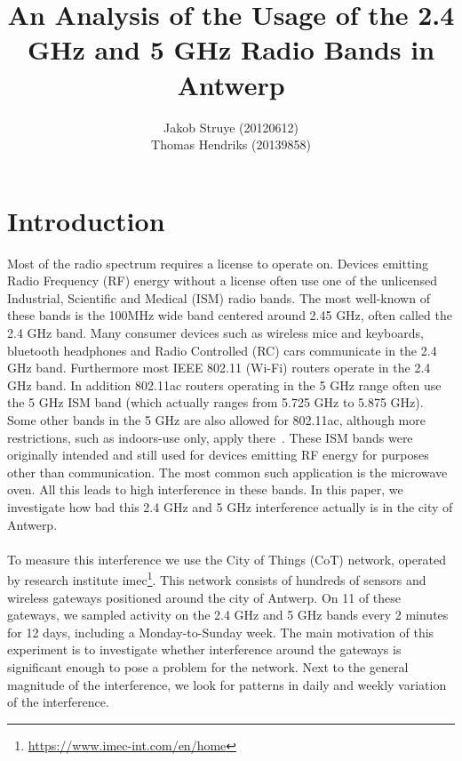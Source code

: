 \documentclass[a4paper, 11pt]{article}
\begin{document}
%
\title{An Analysis of the Usage of the 2.4 GHz and 5 GHz Radio Bands in Antwerp}


\author{
	Jakob Struye (20120612)\\ 
    Thomas Hendriks (20139858)\\
}

\maketitle


\tableofcontents
\clearpage

\section{Introduction}
Most of the radio spectrum requires a license to operate on. Devices emitting Radio Frequency (RF) energy without a license often use one of the unlicensed Industrial, Scientific and Medical (ISM) radio bands. The most well-known of these bands is the 100MHz wide band centered around 2.45 GHz, often called the 2.4 GHz band. Many consumer devices such as wireless mice and keyboards, bluetooth headphones and Radio Controlled (RC) cars communicate in the 2.4 GHz band. Furthermore most IEEE 802.11 (Wi-Fi) routers operate in the 2.4 GHz band. In addition 802.11ac routers operating in the 5 GHz range often use the 5 GHz ISM band (which actually ranges from 5.725 GHz to 5.875 GHz). Some other bands in the 5 GHz are also allowed for 802.11ac, although more restrictions, such as indoors-use only, apply there~\cite{50ism}. These ISM bands were originally intended and still used for devices emitting RF energy for purposes other than communication. The most common such application is the microwave oven. All this leads to high interference in these bands. In this paper, we investigate how bad this 2.4 GHz and 5 GHz interference actually is in the city of Antwerp. \\ \\
To measure this interference we use the City of Things (CoT) network, operated by research institute imec\footnote{\url{https://www.imec-int.com/en/home}}. This network consists of hundreds of sensors and wireless gateways positioned around the city of Antwerp. On 11 of these gateways, we sampled activity on the 2.4 GHz and 5 GHz bands every 2 minutes for 12 days, including a Monday-to-Sunday week. The main motivation of this experiment is to investigate whether interference around the gateways is significant enough to pose a problem for the network. Next to the general magnitude of the interference, we look for patterns in daily and weekly variation of the interference.
\end{document}
